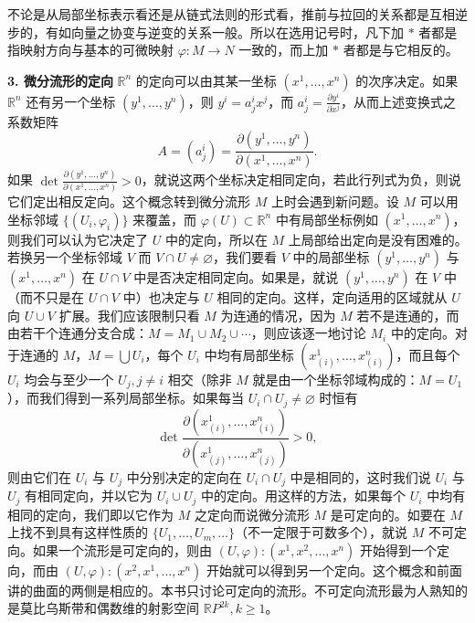 不论是从局部坐标表示看还是从链式法则的形式看，推前与拉回的关系都是互相逆步的，有如向量之协变与逆变的关系一般。所以在选用记号时，凡下加 $*$ 者都是指映射方向与基本的可微映射 $\varphi:M\to N$ 一致的，而上加 $*$ 者都是与它相反的。

\noindent\textbf{3. 微分流形的定向}\quad
$\mathbb R^n$ 的定向可以由其某一坐标 $(x^1,\ldots,x^n)$ 的次序决定。如果 $\mathbb R^n$ 还有另一个坐标 $(y^1,\ldots,y^n)$，则 $y^i=a^i_jx^j$，而 $a^i_j=\frac{\partial y^i}{\partial x^j}$，从而上述变换式之系数矩阵
\[
 A=(a^i_j)=\frac{\partial(y^1,\ldots,y^n)}{\partial(x^1,\ldots,x^n)}.
\]
如果 $\det\frac{\partial(y^1,\ldots,y^n)}{\partial(x^1,\ldots,x^n)}>0$，就说这两个坐标决定相同定向，若此行列式为负，则说它们定出相反定向。这个概念转到微分流形 $M$ 上时会遇到新问题。设 $M$ 可以用坐标邻域 $\{(U_i,\varphi_i)\}$ 来覆盖，而 $\varphi(U)\subset\mathbb R^n$ 中有局部坐标例如 $(x^1,\ldots,x^n)$，则我们可以认为它决定了 $U$ 中的定向，所以在 $M$ 上局部给出定向是没有困难的。若换另一个坐标邻域 $V$ 而 $V\cap U\ne\varnothing$，我们要看 $V$ 中的局部坐标 $(y^1,\ldots,y^n)$ 与 $(x^1,\ldots,x^n)$ 在 $U\cap V$ 中是否决定相同定向。如果是，就说 $(y^1,\ldots,y^n)$ 在 $V$ 中（而不只是在 $U\cap V$ 中）也决定与 $U$ 相同的定向。这样，定向适用的区域就从 $U$ 向 $U\cup V$ 扩展。我们应该限制只看 $M$ 为连通的情况，因为 $M$ 若不是连通的，而由若干个连通分支合成：$M=M_1\cup M_2\cup\cdots$，则应该逐一地讨论 $M_i$ 中的定向。对于连通的 $M$，$M=\bigcup U_i$，每个 $U_i$ 中均有局部坐标 $(x^1_{(i)},\ldots,x^n_{(i)})$，而且每个 $U_i$ 均会与至少一个 $U_j,j\ne i$ 相交（除非 $M$ 就是由一个坐标邻域构成的：$M=U_1$），而我们得到一系列局部坐标。如果每当 $U_i\cap U_j\ne\varnothing$ 时恒有
\[
 \det\frac{\partial(x^1_{(i)},\ldots,x^n_{(i)})}{\partial(x^1_{(j)},\ldots,x^n_{(j)})}>0,
\]
则由它们在 $U_i$ 与 $U_j$ 中分别决定的定向在 $U_i\cap U_j$ 中是相同的，这时我们说 $U_i$ 与 $U_j$ 有相同定向，并以它为 $U_i\cup U_j$ 中的定向。用这样的方法，如果每个 $U_i$ 中均有相同的定向，我们即以它作为 $M$ 之定向而说微分流形 $M$ 是可定向的。如要在 $M$ 上找不到具有这样性质的 $\{U_1,\ldots,U_m,\ldots\}$（不一定限于可数多个），就说 $M$ 不可定向。如果一个流形是可定向的，则由 $(U,\varphi):(x^1,x^2,\ldots,x^n)$ 开始得到一个定向，而由 $(U,\varphi):(x^2,x^1,\ldots,x^n)$ 开始就可以得到另一个定向。这个概念和前面讲的曲面的两侧是相应的。本书只讨论可定向的流形。不可定向流形最为人熟知的是莫比乌斯带和偶数维的射影空间 $\mathbb RP^{2k},k\ge1$。


